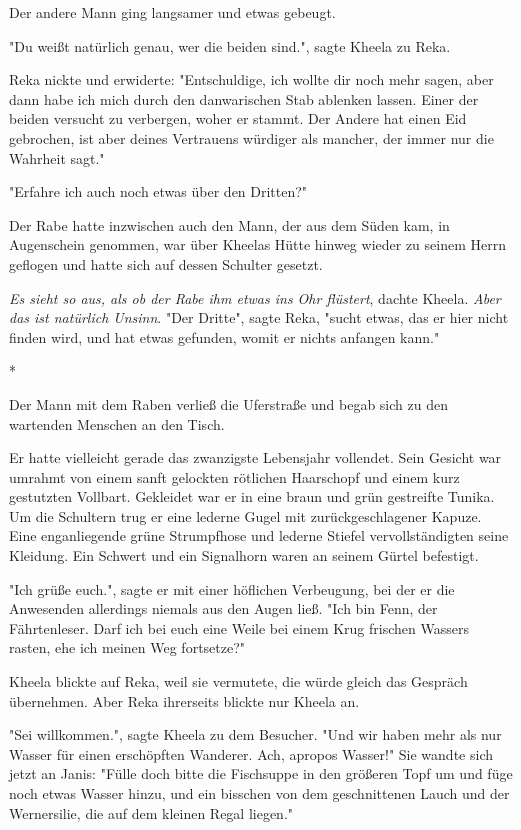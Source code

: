 \documentclass[10pt, a4paper, oneside]{book}
\begin{document}
\begin{multicols}{2}
Der andere Mann ging langsamer und etwas gebeugt.

"Du weißt natürlich genau, wer die beiden sind.", sagte Kheela zu Reka.

Reka nickte und erwiderte: "Entschuldige, ich wollte dir noch mehr sagen, aber 
dann habe ich mich durch den danwarischen Stab ablenken lassen. Einer der beiden versucht zu verbergen, woher er stammt. Der Andere hat einen Eid gebrochen, ist aber deines Vertrauens würdiger als mancher, der immer nur die Wahrheit sagt." 

"Erfahre ich auch noch etwas über den Dritten?" 

Der Rabe hatte inzwischen auch den Mann, der aus dem Süden kam, in Augenschein genommen, war über Kheelas Hütte hinweg wieder zu seinem Herrn geflogen und hatte sich auf dessen Schulter gesetzt. 

\textit{Es sieht so aus, als ob der Rabe ihm etwas ins Ohr flüstert}, dachte Kheela. \textit{Aber das ist natürlich Unsinn}. 
"Der Dritte", sagte Reka, "sucht etwas, das er hier nicht finden wird, und hat etwas gefunden, womit er nichts anfangen kann." 

\begin{center}
    * 
\end{center}

Der Mann mit dem Raben verließ die Uferstraße und begab sich zu den 
wartenden Menschen an den Tisch.

Er hatte vielleicht gerade das zwanzigste Lebensjahr vollendet. Sein Gesicht war umrahmt von einem sanft gelockten rötlichen Haarschopf und einem kurz gestutzten Vollbart. Gekleidet war er in eine braun und grün gestreifte Tunika. Um die Schultern trug er eine lederne Gugel mit zurückgeschlagener Kapuze. Eine enganliegende grüne Strumpfhose und lederne Stiefel vervollständigten seine Kleidung. Ein Schwert und ein Signalhorn waren an seinem Gürtel befestigt. 

"Ich grüße euch.", sagte er mit einer höflichen Verbeugung, bei der er die Anwesenden allerdings niemals aus den Augen ließ. "Ich bin Fenn, der Fährtenleser. Darf ich bei euch eine Weile bei einem Krug frischen Wassers rasten, ehe ich meinen Weg fortsetze?" 

Kheela blickte auf Reka, weil sie vermutete, die würde gleich das Gespräch übernehmen. Aber Reka ihrerseits blickte nur Kheela an. 

"Sei willkommen.", sagte Kheela zu dem Besucher. "Und wir haben mehr als nur Wasser für einen erschöpften Wanderer. Ach, apropos Wasser!" Sie wandte sich jetzt an Janis: "Fülle doch bitte die Fischsuppe in den größeren Topf um und füge noch etwas Wasser hinzu, und ein bisschen von dem geschnittenen Lauch und der Wernersilie, die auf dem kleinen Regal liegen." 


\end{multicols}
\end{document}
